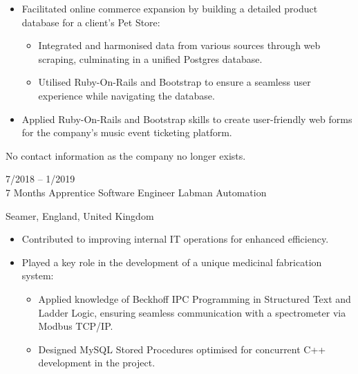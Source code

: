 \documentclass[9pt]{developercv} %
\begin{document}
\begin{entrylist}
{		\begin{itemize}
		    \item[\ding{117}] Facilitated online commerce expansion by building a detailed product database for a client's Pet Store:
		    \begin{itemize}
		        \item[\ding{118}] Integrated and harmonised data from various sources through web scraping, culminating in a unified Postgres database.
		        \item[\ding{118}] Utilised Ruby-On-Rails and Bootstrap to ensure a seamless user experience while navigating the database.
		    \end{itemize}
		    \item[\ding{117}] Applied Ruby-On-Rails and Bootstrap skills to create user-friendly web forms for the company's music event ticketing platform.
		\end{itemize}

		\vspace{1em}
		 No contact information as the company no longer exists.
		\vspace{1em}

		}
	\entry
		{7/2018 -- 1/2019\\7 Months}
		{Apprentice Software Engineer}
		{Labman Automation}
		{Seamer, England, United Kingdom
		
		\begin{itemize}
		    \item[\ding{117}] Contributed to improving internal IT operations for enhanced efficiency.
		    \item[\ding{117}] Played a key role in the development of a unique medicinal fabrication system:
		    \begin{itemize}
		        \item[\ding{118}] Applied knowledge of Beckhoff IPC Programming in Structured Text and Ladder Logic, ensuring seamless communication with a spectrometer via Modbus TCP/IP.
		        \item[\ding{118}] Designed MySQL Stored Procedures optimised for concurrent C++ development in the project.
		    \end{itemize}
		\end{itemize}

		\vspace{1em}
		\hspace{2em}
		\vspace{1em}
		}
		

\end{entrylist}
\end{document}
